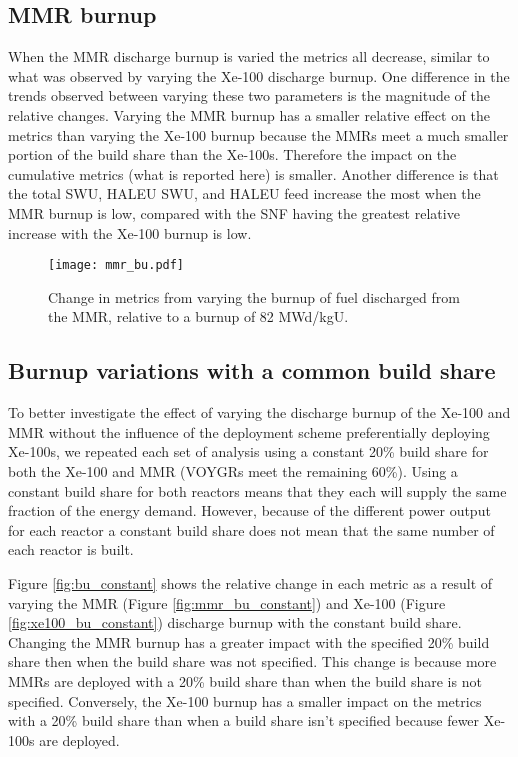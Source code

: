 \subsection{MMR burnup}
When the \gls{MMR} discharge burnup is varied the metrics all decrease, similar 
to what was observed by varying the Xe-100 discharge burnup. One difference in 
the trends observed between varying these two parameters is the magnitude of 
the relative changes. Varying the \gls{MMR} burnup has a smaller relative effect 
on the metrics than varying the Xe-100 burnup because the \glspl{MMR}
meet a much smaller portion of the build share than the Xe-100s.
Therefore the impact on the cumulative metrics 
(what is reported here) is smaller. Another difference is that the total 
\gls{SWU}, \gls{HALEU} \gls{SWU}, and \gls{HALEU} feed increase the most 
when the \gls{MMR} burnup is low, compared with the \gls{SNF} having the 
greatest relative increase with the Xe-100 burnup is low. 

\begin{figure}
    \centering
    \texttt{[image: mmr\_bu.pdf]}
    \caption{Change in metrics from varying the burnup of fuel 
    discharged from the MMR, relative to a burnup of 82 MWd/kgU.}
    \label{fig:mmr_bu_s7}
\end{figure}

\subsection{Burnup variations with a common build share}
To better investigate the effect of varying the discharge burnup of the Xe-100 
and \gls{MMR} without the influence of the deployment scheme preferentially
deploying Xe-100s, we repeated each set of analysis using a constant 20\% 
build share for both the Xe-100 and \gls{MMR} (VOYGRs meet the remaining 60\%). 
Using a constant build share for 
both reactors means that they each will supply the same fraction of the energy demand.
However, because of the different power output for each reactor a constant build 
share does not mean that the same number of each reactor is built. 

Figure \ref{fig:bu_constant} shows the relative change in each metric as a result 
of varying the \gls{MMR} (Figure \ref{fig:mmr_bu_constant}) and Xe-100 
(Figure \ref{fig:xe100_bu_constant}) discharge burnup with the constant build 
share. Changing the \gls{MMR} burnup has a greater impact with the specified 20\% 
build share then when the build share was not specified. This change is because 
more \glspl{MMR} are deployed with a 20\% build share than when the build share is 
not specified. Conversely, the Xe-100 burnup has a smaller impact on the metrics 
with a 20\% build share than when a build share isn't specified because fewer 
Xe-100s are deployed. 

